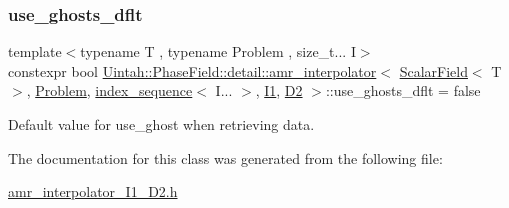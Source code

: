 \subsubsection{\texorpdfstring{use\+\_\+ghosts\+\_\+dflt}{use\_ghosts\_dflt}}
{\footnotesize\ttfamily template$<$typename T , typename Problem , size\+\_\+t... I$>$ \\
constexpr bool \hyperlink{classUintah_1_1PhaseField_1_1detail_1_1amr__interpolator}{Uintah\+::\+Phase\+Field\+::detail\+::amr\+\_\+interpolator}$<$ \hyperlink{structUintah_1_1PhaseField_1_1ScalarField}{Scalar\+Field}$<$ T $>$, \hyperlink{classUintah_1_1PhaseField_1_1Problem}{Problem}, \hyperlink{namespaceUintah_1_1PhaseField_a237de804d99512e50613aff7c94a9461}{index\+\_\+sequence}$<$ I... $>$, \hyperlink{namespaceUintah_1_1PhaseField_a547ce3002aa97fbd3ef3192a6eec8406a66f19efe774b0d2b6e5844eb2d83d305}{I1}, \hyperlink{namespaceUintah_1_1PhaseField_a12bfc68444894dffdf0cb8d9cf0cc76aa1a451dae278b0103a94105c8776e9a67}{D2} $>$\+::use\+\_\+ghosts\+\_\+dflt = false\hspace{0.3cm}{\ttfamily [static]}}



Default value for use\+\_\+ghost when retrieving data. 



The documentation for this class was generated from the following file\+:\begin{DoxyCompactItemize}
\item 
\hyperlink{amr__interpolator__I1__D2_8h}{amr\+\_\+interpolator\+\_\+\+I1\+\_\+\+D2.\+h}\end{DoxyCompactItemize}
